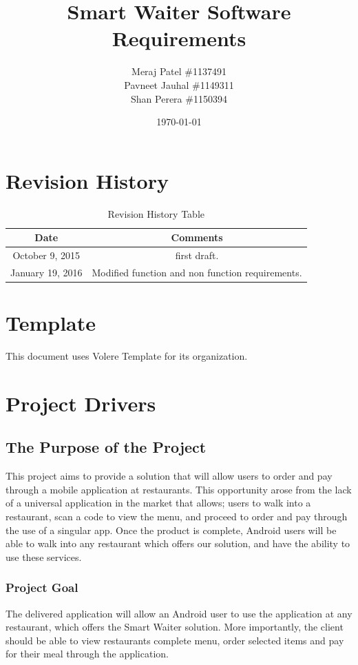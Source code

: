 \documentclass[12pt, titlepage]{article}
\begin{document}
\title{Smart Waiter Software Requirements} 
\author{Meraj Patel \#1137491 \\ Pavneet Jauhal \#1149311\\ Shan Perera \#1150394}
\date{\today}
\maketitle

\tableofcontents 

\listoffigures

\listoftables

\begin{table}[H]
\section*{Revision History}
\begin{tabular}{|c|c|}
\hline
\textbf{Date}  & \textbf{Comments} \\ \hline
October 9, 2015 &  first draft. \\ 
January 19, 2016 &  Modified function and non function requirements. \\ 
\hline
\end{tabular}
\caption{Revision History Table}
\end{table}

\section*{Template}
This document uses Volere Template for its organization.
\pagebreak

\section{Project Drivers}

\subsection{The Purpose of the Project}
This project aims to provide a solution that will allow users to order and pay through a mobile application at restaurants. This opportunity arose from the lack of a universal application in the market that allows; users to walk into a restaurant, scan a code to view the menu, and proceed to order and pay through the use of a singular app. Once the product is complete, Android users will be able to walk into any restaurant which offers our solution, and have the ability to use these services.
\subsubsection{Project Goal}
The delivered application will allow an Android user to use the application at any restaurant, which offers the Smart Waiter solution.  More importantly, the client should be able to view restaurants complete menu, order selected items and pay for their meal through the application. 
\end{document}
